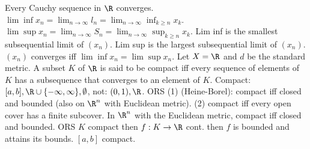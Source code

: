  Every Cauchy sequence in $\R$ converges.
 $\lim \inf x_n = \lim_{n \to \infty} l_n = \lim_{n \to \infty} \inf_{k \geq n} x_k$.
$\lim \sup x_n = \lim_{n \to \infty} S_n = \lim_{n \to \infty} \sup_{k \geq n} x_k$.
 Lim inf is the smallest subsequential limit of $(x_n)$.
Lim sup is the largest subsequential limit of $(x_n)$.
$(x_n)$ converges iff $\lim \inf x_n = \lim \sup x_n$.
 Let $X = \R$ and $d$ be the standard metric.
A subset $K$ of $\R$ is said to be compact iff every sequence of elements of $K$
has a subsequence that converges to an element of $K$.
Compact: $[a,b], \R \cup \{-\infty, \infty\}, \emptyset$, not: $(0,1), \R$.
 ORS
(1) (Heine-Borel): compact iff closed and bounded (also on $\R^n$ with Euclidean metric).
(2) compact iff every open cover has a finite subcover.
 In $\R^n$ with the Euclidean metric, compact iff closed and bounded.
\wt{} ORS $K$ compact then $f: K \to \R$ cont. then $f$ is bounded and attains its bounds.
$[a,b]$ compact.